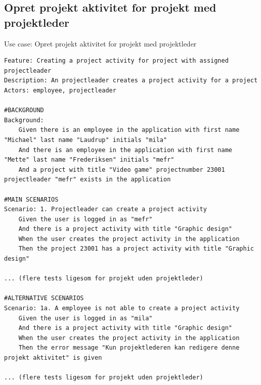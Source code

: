 \subsection{Opret projekt aktivitet for projekt med projektleder} 
\begin{listing}[H]
    \centering
    \caption{Use case: Opret projekt aktivitet for projekt med projektleder} \label{lst:usecase_project_activity_with_leader}
    \begin{verbatim}  
Feature: Creating a project activity for project with assigned projectleader
Description: An projectleader creates a project activity for a project
Actors: employee, projectleader

#BACKGROUND
Background:
    Given there is an employee in the application with first name "Michael" last name "Laudrup" initials "mila"
    And there is an employee in the application with first name "Mette" last name "Frederiksen" initials "mefr"
    And a project with title "Video game" projectnumber 23001 projectleader "mefr" exists in the application

#MAIN SCENARIOS
Scenario: 1. Projectleader can create a project activity
    Given the user is logged in as "mefr"
    And there is a project activity with title "Graphic design"  
    When the user creates the project activity in the application 
    Then the project 23001 has a project activity with title "Graphic design" 

... (flere tests ligesom for projekt uden projektleder)

#ALTERNATIVE SCENARIOS
Scenario: 1a. A employee is not able to create a project activity
    Given the user is logged in as "mila"
    And there is a project activity with title "Graphic design"  
    When the user creates the project activity in the application 
    Then the error message "Kun projektlederen kan redigere denne projekt aktivitet" is given
    
... (flere tests ligesom for projekt uden projektleder)

    \end{verbatim}
\end{listing}

